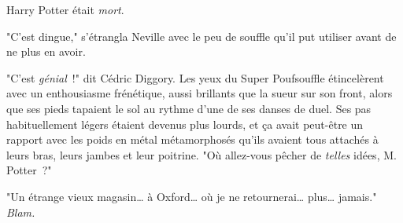 Harry Potter était \emph{mort}.

\later

"C'est dingue," s'étrangla Neville avec le peu de souffle qu'il put utiliser avant de ne plus en avoir.

"C'est \emph{génial}~!" dit Cédric Diggory. Les yeux du Super Poufsouffle étincelèrent avec un enthousiasme frénétique, aussi brillants que la sueur sur son front, alors que ses pieds tapaient le sol au rythme d'une de ses danses de duel. Ses pas habituellement légers étaient devenus plus lourds, et ça avait peut-être un rapport avec les poids en métal métamorphosés qu'ils avaient tous attachés à leurs bras, leurs jambes et leur poitrine. "Où allez-vous pêcher de \emph{telles} idées, M. Potter~?"

"Un étrange vieux magasin… à Oxford… où je ne retournerai… plus… jamais." \emph{Blam.} 

